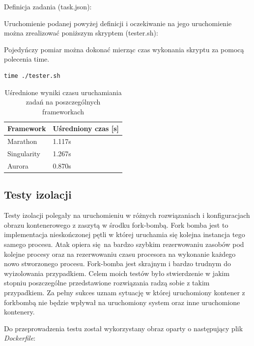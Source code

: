 \documentclass[10pt,a4paper,titlepage,twoside]{report}
\begin{document}
Definicja zadania (task.json):


Uruchomienie podanej powyżej definicji i oczekiwanie na jego uruchomienie można zrealizować poniższym skryptem (tester.sh):


Pojedyńczy pomiar można dokonać mierząc czas wykonania skryptu za pomocą polecenia time.
\begin{lstlisting}
time ./tester.sh
\end{lstlisting}

\begin{table}[!h]
\caption{Uśrednione wyniki czasu uruchamiania zadań na poszczególnych frameworkach}
\label{framework_results}
\centering
\begin{tabular}{|p{4cm}|p{4cm}|}
  \hline
  \textbf{Framework} & \textbf{Uśredniony czas [s]} \\
  \hline
  Marathon & 1.117s \\
  \hline
  Singularity & 1.267s \\
  \hline
  Aurora & 0.870s \\
  \hline
\end{tabular}
\end{table}

\subsection{Testy izolacji}
Testy izolacji polegały na uruchomieniu w różnych rozwiązaniach i konfiguracjach obrazu kontenerowego z zaszytą w środku fork-bombą. Fork bomba jest to implementacja nieskończonej pętli w której uruchamia się kolejna instancja tego samego procesu. Atak opiera się na bardzo szybkim rezerwowaniu zasobów pod kolejne procesy oraz na rezerwowaniu czasu procesora na wykonanie każdego nowo stworzonego procesu. Fork-bomba jest skrajnym i bardzo trudnym do wyizolowania przypadkiem. Celem moich testów było stwierdzenie w jakim stopniu poszczególne przedstawione rozwiązania radzą sobie z takim przypadkiem. Za pełny sukces uznam sytuację w której uruchomiony kontener z forkbombą nie będzie wpływał na uruchomiony system oraz inne uruchomione kontenery.

Do przeprowadzenia testu został wykorzystany obraz oparty o następujący plik \textit{Dockerfile}:

\end{document}
